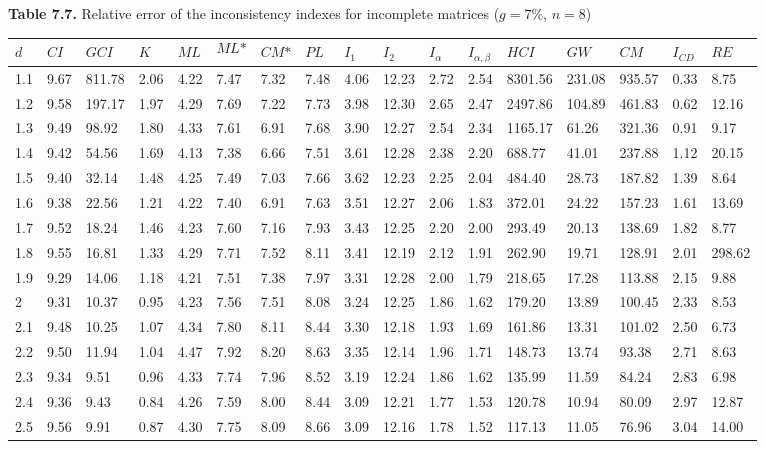 \newpage
\textbf{Table 7.7.} Relative error of the inconsistency indexes for incomplete matrices ($g=7\%$, $n=8$)
\begin{adjustbox}{angle=90}
  \begin{center}
    \begin{tabular}{|l|llllllllllllllll|}
      \hline $d$ &
$\textit{CI}$&$\textit{GCI}$&$K$&$\textit{ML}$&$$\textit{ML*}$$&$\textit{CM*}$&$\textit{PL}$&$\textit{I}_1$&$\textit{I}_2$&$\textit{I}_{\alpha}$&$\textit{I}_{\alpha,\beta}$&$\textit{HCI}$&$\textit{GW}$&$\textit{CM}$&$\textit{I}_{CD}$&$\textit{RE}$\\ \hline \hline
1.1&9.67&811.78&2.06&4.22&7.47&7.32&7.48&4.06&12.23&2.72&2.54&8301.56&231.08&935.57&0.33&8.75  \\ 
1.2&9.58&197.17&1.97&4.29&7.69&7.22&7.73&3.98&12.30&2.65&2.47&2497.86&104.89&461.83&0.62&12.16  \\ 
1.3&9.49&98.92&1.80&4.33&7.61&6.91&7.68&3.90&12.27&2.54&2.34&1165.17&61.26&321.36&0.91&9.17  \\ 
1.4&9.42&54.56&1.69&4.13&7.38&6.66&7.51&3.61&12.28&2.38&2.20&688.77&41.01&237.88&1.12&20.15  \\ 
1.5&9.40&32.14&1.48&4.25&7.49&7.03&7.66&3.62&12.23&2.25&2.04&484.40&28.73&187.82&1.39&8.64  \\ 
1.6&9.38&22.56&1.21&4.22&7.40&6.91&7.63&3.51&12.27&2.06&1.83&372.01&24.22&157.23&1.61&13.69  \\ 
1.7&9.52&18.24&1.46&4.23&7.60&7.16&7.93&3.43&12.25&2.20&2.00&293.49&20.13&138.69&1.82&8.77  \\ 
1.8&9.55&16.81&1.33&4.29&7.71&7.52&8.11&3.41&12.19&2.12&1.91&262.90&19.71&128.91&2.01&298.62  \\ 
1.9&9.29&14.06&1.18&4.21&7.51&7.38&7.97&3.31&12.28&2.00&1.79&218.65&17.28&113.88&2.15&9.88  \\ 
2&9.31&10.37&0.95&4.23&7.56&7.51&8.08&3.24&12.25&1.86&1.62&179.20&13.89&100.45&2.33&8.53  \\ 
2.1&9.48&10.25&1.07&4.34&7.80&8.11&8.44&3.30&12.18&1.93&1.69&161.86&13.31&101.02&2.50&6.73  \\ 
2.2&9.50&11.94&1.04&4.47&7.92&8.20&8.63&3.35&12.14&1.96&1.71&148.73&13.74&93.38&2.71&8.63  \\ 
2.3&9.34&9.51&0.96&4.33&7.74&7.96&8.52&3.19&12.24&1.86&1.62&135.99&11.59&84.24&2.83&6.98  \\ 
2.4&9.36&9.43&0.84&4.26&7.59&8.00&8.44&3.09&12.21&1.77&1.53&120.78&10.94&80.09&2.97&12.87  \\ 
2.5&9.56&9.91&0.87&4.30&7.75&8.09&8.66&3.09&12.16&1.78&1.52&117.13&11.05&76.96&3.04&14.00  \\ 

\end{tabular}
\end{center}
\end{adjustbox}
